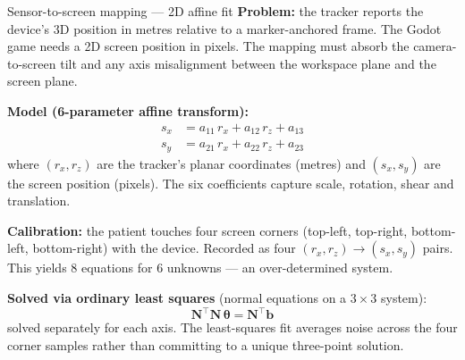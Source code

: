\documentclass[10pt,aspectratio=169]{beamer}
\begin{document}
\begin{frame}{Sensor-to-screen mapping --- 2D affine fit}
\textbf{Problem:} the tracker reports the device's 3D position in metres relative to a marker-anchored frame. The Godot game needs a 2D screen position in pixels. The mapping must absorb the camera-to-screen tilt and any axis misalignment between the workspace plane and the screen plane.

\textbf{Model (6-parameter affine transform):}
\begin{align*}
s_x &= a_{11} \, r_x + a_{12} \, r_z + a_{13} \\
s_y &= a_{21} \, r_x + a_{22} \, r_z + a_{23}
\end{align*}
where $(r_x, r_z)$ are the tracker's planar coordinates (metres) and $(s_x, s_y)$ are the screen position (pixels). The six coefficients capture scale, rotation, shear and translation.

\textbf{Calibration:} the patient touches four screen corners (top-left, top-right, bottom-left, bottom-right) with the device. Recorded as four $(r_x, r_z) \to (s_x, s_y)$ pairs. This yields $8$ equations for $6$ unknowns --- an over-determined system.

\textbf{Solved via ordinary least squares} (normal equations on a $3 \times 3$ system):
\[
\mathbf{N}^\top \mathbf{N} \, \boldsymbol{\theta} = \mathbf{N}^\top \mathbf{b}
\]
solved separately for each axis. The least-squares fit averages noise across the four corner samples rather than committing to a unique three-point solution.
\end{frame}
\end{document}
